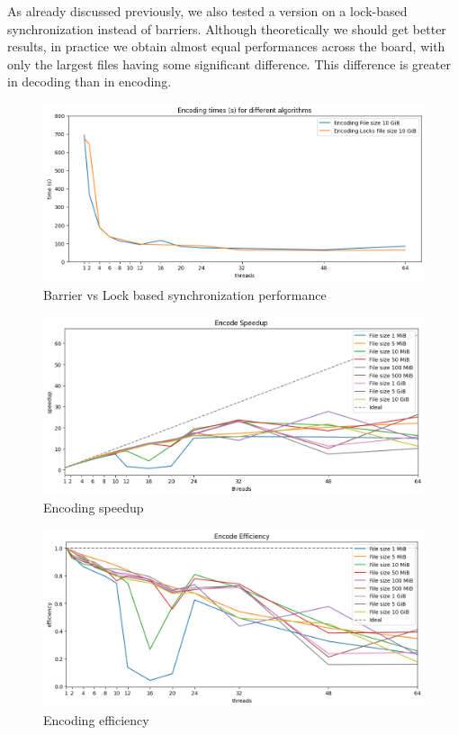 As already discussed previously, we also tested a version on a lock-based synchronization instead of barriers. Although theoretically we should get better results, in practice we obtain almost equal performances across the board, with only the largest files having some significant difference. This difference is greater in decoding than in encoding.
\begin{figure}
	\centering
	\includegraphics[width=1\linewidth]{"../imgs/Barrier vs Locks encoding"}
	\caption{Barrier vs Lock based synchronization performance}
	\label{fig:barrier-vs-locks-encoding}
\end{figure}

\begin{figure}
	\centering
	\includegraphics[width=1\linewidth]{"../imgs/encoding speedup wide"}
	\caption{Encoding speedup}
	\label{fig:encoding-speedup}
\end{figure}
\begin{figure}
	\centering
	\includegraphics[width=1\linewidth]{"../imgs/encode efficiency wide"}
	\caption{Encoding efficiency}
	\label{fig:encoding-efficiency}
\end{figure}

